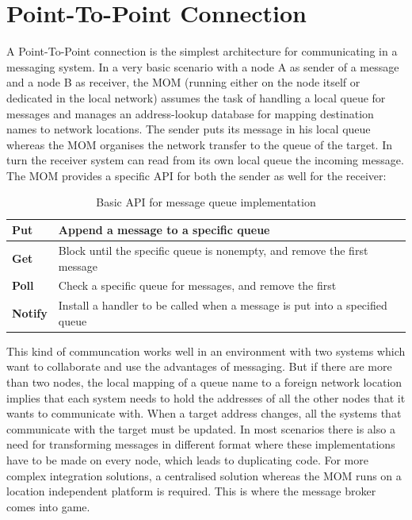 \section{Point-To-Point Connection}
\label{intro-messaging-pointtopoint}
A Point-To-Point connection is the simplest architecture for communicating in a
messaging system. In a very basic scenario with a node A as sender of a message
and a node B as receiver, the MOM (running either on the node itself or
dedicated in the local network) assumes the task of handling a local queue for messages and manages an address-lookup
database for mapping destination names to network locations. The sender puts its
message in his local queue whereas the MOM organises the network transfer to the
queue of the target. In turn the receiver system can read from its own
local queue the incoming message. The MOM provides a specific API for both the
sender as well for the receiver:
\begin{table}[H]
\centering
\begin{tabular}{|l|l|}
\hline
\textbf{Put}    & Append a message to a specific queue                                        \\ \hline
\textbf{Get}    & Block until the specific queue is nonempty, and remove the first message    \\ \hline
\textbf{Poll}   & Check a specific queue for messages, and remove the first                   \\ \hline
\textbf{Notify} & Install a handler to be called when a message is put into a specified queue \\ \hline
\end{tabular}
\caption{Basic API for message queue implementation \cite{TAN06}}
\end{table}

This kind of communcation works well in an environment with two systems which
want to collaborate and use the advantages of messaging. But if there are more
than two nodes, the local mapping of a queue name to a foreign network location
implies that each system needs to hold the addresses of all the other nodes that it
wants to communicate with. When a target address changes, all the systems that
communicate with the target must be updated. In most scenarios there is also a need
for transforming messages in different format where these implementations have
to be made on every node, which leads to duplicating code.  For more complex
integration solutions, a centralised solution whereas the MOM runs on a location
independent platform is required. This is where the message broker comes into
game. \cite{MSDNIntegration}

